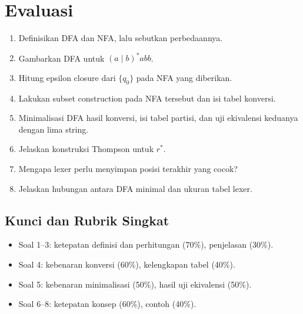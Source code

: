 \section*{Evaluasi}

\begin{enumerate}[label=\arabic*.,leftmargin=*]
  \item Definisikan DFA dan NFA, lalu sebutkan perbedaannya.
  \item Gambarkan DFA untuk \((a \mid b)^{*}abb\).
  \item Hitung epsilon closure dari \(\{q_0\}\) pada NFA yang
        diberikan.
  \item Lakukan subset construction pada NFA tersebut dan isi tabel
        konversi.
  \item Minimalisasi DFA hasil konversi, isi tabel partisi, dan uji
        ekivalensi keduanya dengan lima string.
  \item Jelaskan konstruksi Thompson untuk \(r^{*}\).
  \item Mengapa lexer perlu menyimpan posisi terakhir yang cocok?
  \item Jelaskan hubungan antara DFA minimal dan ukuran tabel lexer.
\end{enumerate}

\subsection*{Kunci dan Rubrik Singkat}
\begin{itemize}[leftmargin=*]
  \item Soal 1--3: ketepatan definisi dan perhitungan (70\%),
        penjelasan (30\%).
  \item Soal 4: kebenaran konversi (60\%), kelengkapan tabel (40\%).
  \item Soal 5: kebenaran minimalisasi (50\%), hasil uji ekivalensi
        (50\%).
  \item Soal 6--8: ketepatan konsep (60\%), contoh (40\%).
\end{itemize}
